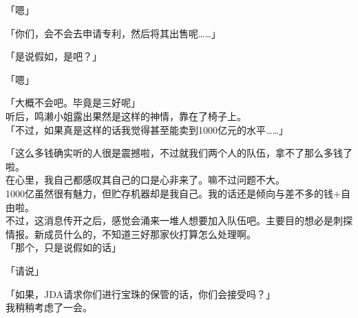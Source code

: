 「嗯」

「你们，会不会去申请专利，然后将其出售呢……」

「是说假如，是吧？」

「嗯」

「大概不会吧。毕竟是三好呢」\\

听后，鸣濑小姐露出果然是这样的神情，靠在了椅子上。\\

「不过，如果真是这样的话我觉得甚至能卖到1000亿元的水平……」

「这么多钱确实听的人很是震撼啦，不过就我们两个人的队伍，拿不了那么多钱了啦。\\

在心里，我自己都感叹其自己的口是心非来了。嘛不过问题不大。\\

1000亿虽然很有魅力，但贮存机器却是我自己。我的话还是倾向与差不多的钱+自由啦。\\

不过，这消息传开之后，感觉会涌来一堆人想要加入队伍吧。主要目的想必是刺探情报。新成员什么的，不知道三好那家伙打算怎么处理啊。\\

「那个，只是说假如的话」

「请说」

「如果，JDA请求你们进行宝珠的保管的话，你们会接受吗？」\\

我稍稍考虑了一会。

